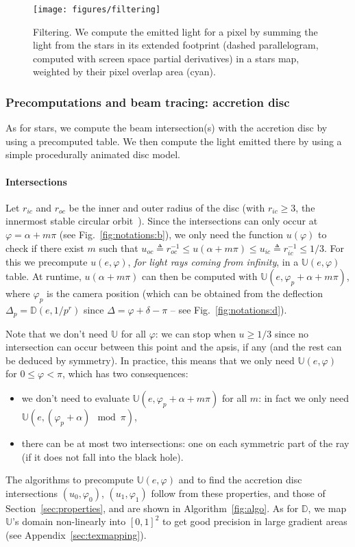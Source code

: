 \documentclass{document}
\begin{document}
\begin{figure}[t]
	\centering
	\texttt{[image: figures/filtering]}
	\caption{\label{fig:filtering}Filtering. We compute the emitted light for a 
	pixel by summing the light from the stars in its extended footprint (dashed 
	parallelogram, computed with screen space partial derivatives) in a stars 
	map, weighted by their pixel overlap area (cyan).}
\end{figure}
  
\subsubsection{Precomputations and beam tracing: accretion disc}

As for stars, we compute the beam intersection(s) with the accretion disc by 
using a precomputed table. We then compute the light emitted there by using a 
simple procedurally animated disc model.

\paragraph*{Intersections} Let $r_{ic}$ and $r_{oc}$ be the inner and outer 
radius of the disc (with $r_{ic}\ge 3$, the innermost stable circular 
orbit~\cite{Lasota2016}). Since the intersections can only occur at 
$\varphi = \alpha + m\pi$ (see Fig.~\ref{fig:notations:b}), we only need the 
function $u(\varphi)$ to check if there exist $m$ such that $u_{oc} \triangleq 
r_{oc}^{-1} \le u(\alpha + m\pi) \le u_{ic} \triangleq r_{ic}^{-1} \le 1 / 3$. 
For this we precompute $u(e, \varphi)$, {\em for light rays coming from 
infinity}, in a $\mathbb{U}(e, \varphi)$ table. At runtime, $u(\alpha + m\pi)$ 
can then be computed with $\mathbb{U}(e, \varphi_p + \alpha + m\pi)$, where 
$\varphi_p$ is the camera position (which can be obtained from the deflection 
$\Delta_p = \mathbb{D}(e, 1/p^r)$ since $\Delta = \varphi + \delta - \pi$ -- 
see Fig.~\ref{fig:notations:d}).

Note that we don't need $\mathbb{U}$ for all $\varphi$: we can stop when $u \ge 
1 / 3$ since no intersection can occur between this point and the apsis, if any 
(and the rest can be deduced by symmetry). In practice, this means that we only 
need $\mathbb{U}(e, \varphi)$ for $0 \le \varphi < \pi$, which has two 
consequences:
\begin{itemize}
	\item we don't need to evaluate $\mathbb{U}(e, \varphi_p + \alpha + m\pi)$ 
	for all $m$: in fact we only need $\mathbb{U}(e, (\varphi_p+\alpha)\mod\pi)$,
	\item there can be at most two intersections: one on each symmetric part of 
	the ray (if it does not fall into the black hole).
\end{itemize}
The algorithms to precompute $\mathbb{U}(e, \varphi)$ and to find the accretion 
disc intersections $(u_0, \varphi_0)$, $(u_1, \varphi_1)$ follow from these 
properties, and those of Section~\ref{sec:properties}, and are shown in 
Algorithm~\ref{fig:algo}. As for $\mathbb{D}$, we map $\mathbb{U}$'s domain 
non-linearly into $[0,1]^2$ to get good precision in large gradient areas (see 
Appendix~\ref{sec:texmapping}).
\end{document}
